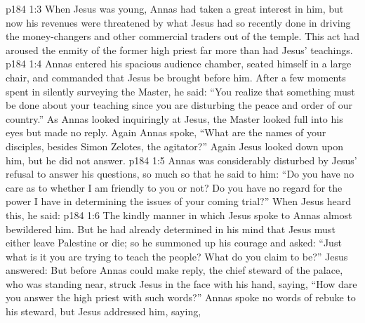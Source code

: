 \vs p184 1:3 When Jesus was young, Annas had taken a great interest in him, but now his revenues were threatened by what Jesus had so recently done in driving the money\hyp{}changers and other commercial traders out of the temple. This act had aroused the enmity of the former high priest far more than had Jesus’ teachings.
\vs p184 1:4 Annas entered his spacious audience chamber, seated himself in a large chair, and commanded that Jesus be brought before him. After a few moments spent in silently surveying the Master, he said: “You realize that something must be done about your teaching since you are disturbing the peace and order of our country.” As Annas looked inquiringly at Jesus, the Master looked full into his eyes but made no reply. Again Annas spoke, “What are the names of your disciples, besides Simon Zelotes, the agitator?” Again Jesus looked down upon him, but he did not answer.
\vs p184 1:5 Annas was considerably disturbed by Jesus’ refusal to answer his questions, so much so that he said to him: “Do you have no care as to whether I am friendly to you or not? Do you have no regard for the power I have in determining the issues of your coming trial?” When Jesus heard this, he said: 
\vs p184 1:6 The kindly manner in which Jesus spoke to Annas almost bewildered him. But he had already determined in his mind that Jesus must either leave Palestine or die; so he summoned up his courage and asked: “Just what is it you are trying to teach the people? What do you claim to be?” Jesus answered:  But before Annas could make reply, the chief steward of the palace, who was standing near, struck Jesus in the face with his hand, saying, “How dare you answer the high priest with such words?” Annas spoke no words of rebuke to his steward, but Jesus addressed him, saying, 
